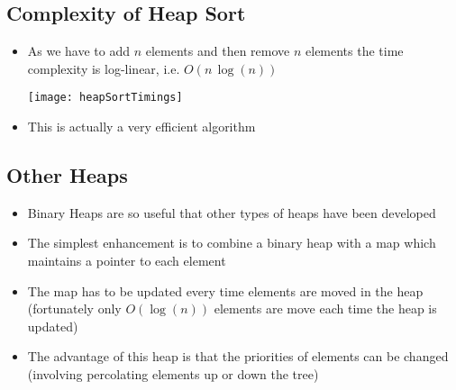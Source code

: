 \begin{slide}
\section[-2]{Complexity of Heap Sort}

\begin{PauseHighLight}
  \begin{itemize}
  \item As we have to add $n$ elements and then remove $n$ elements the
    time complexity is log-linear, i.e. $O(n\,\log(n))$\pause\vspace*{-1cm}
    \begin{center}
      \texttt{[image: heapSortTimings]}\pause
    \end{center}\vspace*{-1cm}
  \item This is actually a very efficient algorithm\pause
  \end{itemize}
\end{PauseHighLight}

\end{slide}


\Outline %

\begin{slide}
\section{Other Heaps}

\begin{PauseHighLight}
  \begin{itemize}
  \item Binary Heaps are so useful that other types of heaps have been
    developed\pause
  \item The simplest enhancement is to combine a binary heap with a map
    which maintains a pointer to each element\pause
  \item The map has to be updated every time elements are moved in the
    heap (fortunately only $O(\log(n))$ elements are move each time the
    heap is updated)\pause
  \item The advantage of this heap is that the priorities of elements
    can be changed (involving percolating elements up or down the tree)\pause
  \end{itemize}
\end{PauseHighLight}


\end{slide}


